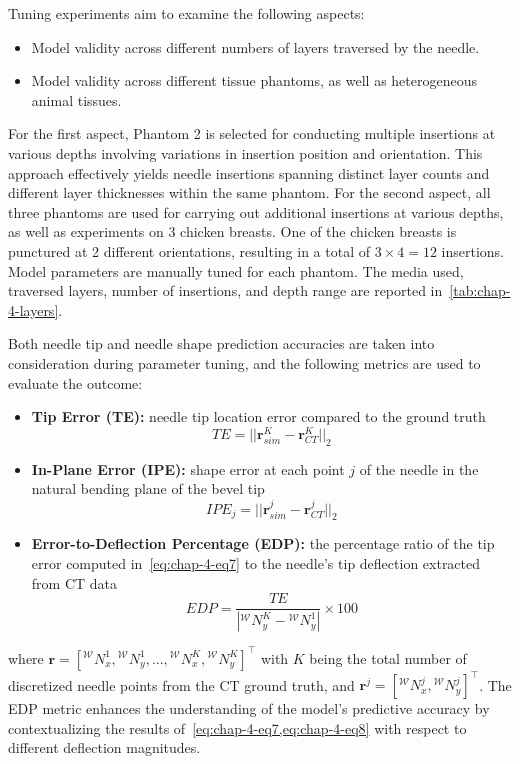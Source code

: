 Tuning experiments aim to examine the following aspects: 
\begin{itemize}
\item Model validity across different numbers of layers traversed by the needle.
\item Model validity across different tissue phantoms, as well as heterogeneous animal tissues.
\end{itemize}

For the first aspect, Phantom 2 is selected for conducting multiple insertions at various depths involving variations in insertion position and orientation. This approach effectively yields needle insertions spanning distinct layer counts and different layer thicknesses within the same phantom. For the second aspect, all three phantoms are used for carrying out additional insertions at various depths, as well as experiments on 3 chicken breasts. One of the chicken breasts is punctured at 2 different orientations, resulting in a total of $3\times4 = 12$ insertions. Model parameters are manually tuned for each phantom. The media used, traversed layers, number of insertions, and depth range are reported in~\cref{tab:chap-4-layers}.

Both needle tip and needle shape prediction accuracies are taken into consideration during parameter tuning, and the following metrics are used to evaluate the outcome:
\begin{itemize}
\item \textbf{Tip Error (TE):} needle tip location error compared to the ground truth
\begin{equation} \label{eq:chap-4-eq7}
TE = ||\boldsymbol{r}^K_{sim} - \boldsymbol{r}^K_{CT}||_2
\end{equation}
\item \textbf{In-Plane Error (IPE):} shape error at each point $j$ of the needle in the natural bending plane of the bevel tip
\begin{equation} \label{eq:chap-4-eq8}
IPE_j = ||\boldsymbol{r}^j_{sim} - \boldsymbol{r}^j_{CT} ||_2
\end{equation}
\item \textbf{Error-to-Deflection Percentage (EDP):} the percentage ratio of the tip error computed in~\cref{eq:chap-4-eq7} to the needle's tip deflection extracted from CT data
\begin{equation}
EDP = \frac{TE}{|{}^{\mathcal{W}}N^K_y - {}^{\mathcal{W}}N^1_y|} \times 100
\end{equation}
\end{itemize}
where $\boldsymbol{r} = [{}^{\mathcal{W}}N^1_x,  {}^{\mathcal{W}}N^1_y,..., {}^{\mathcal{W}}N^K_x, {}^{\mathcal{W}}N^K_y]^\top$ with $K$ being the total number of discretized needle points from the CT ground truth, and $\boldsymbol{r}^j = [{}^{\mathcal{W}}N^j_x,  {}^{\mathcal{W}}N^j_y]^\top$. The EDP metric enhances the understanding of the model's predictive accuracy by contextualizing the results of~\cref{eq:chap-4-eq7,eq:chap-4-eq8} with respect to different deflection magnitudes.

